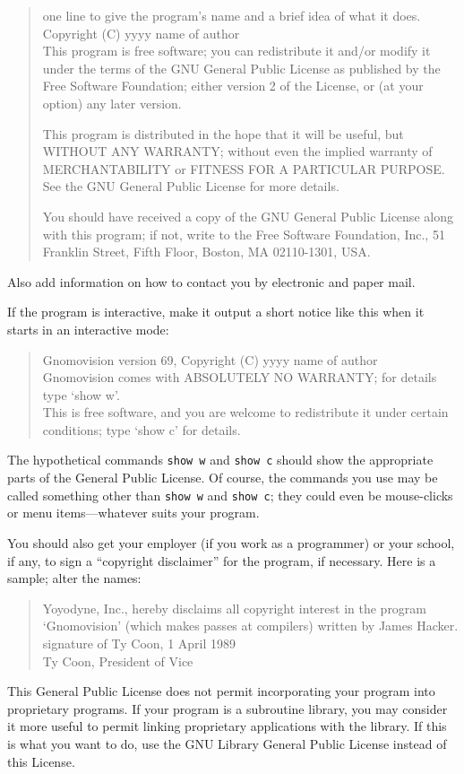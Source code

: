 \documentclass[a4paper,11pt]{book}
\begin{document}
\begin{quote}
	one line to give the program's name and a brief idea of what it does. \\
	Copyright (C) yyyy  name of author \\
	
	This program is free software; you can redistribute it and/or modify
	it under the terms of the GNU General Public License as published by
	the Free Software Foundation; either version 2 of the License, or
	(at your option) any later version.
	
	This program is distributed in the hope that it will be useful,
	but WITHOUT ANY WARRANTY; without even the implied warranty of
	MERCHANTABILITY or FITNESS FOR A PARTICULAR PURPOSE.  See the
	GNU General Public License for more details.
	
	You should have received a copy of the GNU General Public License
	along with this program; if not, write to the Free Software
	Foundation, Inc., 51 Franklin Street, Fifth Floor, Boston, MA  02110-1301, USA.
\end{quote}

Also add information on how to contact you by electronic and paper mail.

If the program is interactive, make it output a short notice like this
when it starts in an interactive mode:

\begin{quote}
	Gnomovision version 69, Copyright (C) yyyy  name of author \\
	Gnomovision comes with ABSOLUTELY NO WARRANTY; for details type `show w'. \\
	This is free software, and you are welcome to redistribute it
	under certain conditions; type `show c' for details.
\end{quote}


The hypothetical commands {\tt show w} and {\tt show c} should show the
appropriate parts of the General Public License.  Of course, the commands
you use may be called something other than {\tt show w} and {\tt show c};
they could even be mouse-clicks or menu items---whatever suits your
program.

You should also get your employer (if you work as a programmer) or your
school, if any, to sign a ``copyright disclaimer'' for the program, if
necessary.  Here is a sample; alter the names:

\begin{quote}
	Yoyodyne, Inc., hereby disclaims all copyright interest in the program \\
	`Gnomovision' (which makes passes at compilers) written by James Hacker. \\
	
	signature of Ty Coon, 1 April 1989 \\
	Ty Coon, President of Vice
\end{quote}


This General Public License does not permit incorporating your program
into proprietary programs.  If your program is a subroutine library, you
may consider it more useful to permit linking proprietary applications
with the library.  If this is what you want to do, use the GNU Library
General Public License instead of this License.
\end{document}
